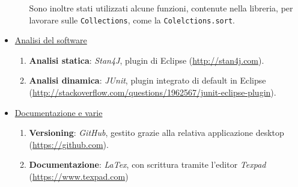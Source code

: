 \begin{itemize}
\begin{enumerate}
				Sono inoltre stati utilizzati alcune funzioni, contenute nella libreria, per lavorare sulle \verb|Collections|, come la \verb|Colelctions.sort|.
		\end{enumerate}
	\item \underline{Analisi del software}
		\begin{enumerate}
			\item \textbf{Analisi statica}: \textit{Stan4J}, plugin di Eclipse (\href{http://stan4j.com}{http://stan4j.com}).
			\item \textbf{Analisi dinamica}: \textit{JUnit}, plugin integrato di default in Eclipse (\href{http://stackoverflow.com/questions/1962567/junit-eclipse-plugin}{http://stackoverflow.com/questions/1962567/junit-eclipse-plugin}).
		\end{enumerate}
	\item \underline{Documentazione e varie}
		\begin{enumerate}
			\item \textbf{Versioning}: \textit{GitHub}, gestito grazie alla relativa applicazione desktop (\href{https://github.com}{https://github.com}).
			\item \textbf{Documentazione}: \textit{LaTex}, con scrittura tramite l'editor \textit{Texpad} (\href{https://www.texpad.com}{https://www.texpad.com})
		\end{enumerate}
\end{itemize}